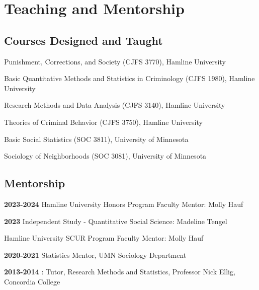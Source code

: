 \documentclass[letterpaper]{article}
\newenvironment{publist}{%
  \begin{list}{}{%
    \setlength{\leftmargin}{0cm}   %
    \setlength{\labelwidth}{2cm}     %
    \setlength{\labelsep}{0.5cm}     %
  }%
}{%
  \end{list}%
}
\begin{document}
\section*{\textbf{Teaching and Mentorship}}

\subsection*{Courses Designed and Taught}


\begin{publist} 

\item Punishment, Corrections, and Society (CJFS 3770), Hamline University
\item Basic Quantitative Methods and Statistics in Criminology (CJFS 1980), Hamline University
\item Research Methods and Data Analysis (CJFS 3140), Hamline University
\item Theories of Criminal Behavior (CJFS 3750), Hamline University
\item Basic Social Statistics (SOC 3811), University of Minnesota
\item Sociology of Neighborhoods (SOC 3081), University of Minnesota

\end{publist}


\subsection*{Mentorship}

\begin{publist}

\item[\textbf{2023-2024}] Hamline University Honors Program Faculty Mentor: Molly Hauf
\item[\textbf{2023}] Independent Study - Quantitative Social Science: Madeline Tengel 
\item Hamline University SCUR Program Faculty Mentor: Molly Hauf
\item[\textbf{2020-2021}] Statistics Mentor, UMN Sociology Department
\item[\textbf{2013-2014}]: Tutor, Research Methods and Statistics, Professor Nick Ellig, Concordia College

\end{publist}
\end{document}
